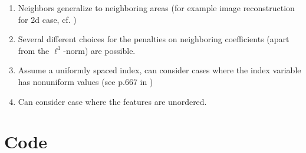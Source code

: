 \documentclass{article}
\theoremstyle{definition}
\begin{document}
\begin{enumerate}
	\item Neighbors generalize to neighboring areas  (for example image reconstruction for 2d case, cf. \citep{sparsity})
	\item Several different choices for the penalties on neighboring coefficients (apart from the $\ell^1$-norm) are possible.
	\item Assume a uniformly spaced index, can consider cases where the index variable has nonuniform values (see p.667 in \citep{sparsity})
	\item Can consider case where the features are unordered.
\end{enumerate}
 
 \citep{elements}

\appendix

\newpage

\section{Code}
\end{document}
